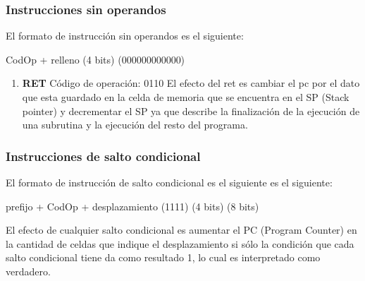 \subsubsection{Instrucciones sin operandos}

El formato de instrucción sin operandos es el siguiente:

 CodOp     +    relleno 
(4 bits)     (000000000000)


\begin{enumerate}
\item \textbf{RET}
Código de operación: 0110
El efecto del ret es cambiar el pc por el dato que esta guardado en la celda de memoria que se encuentra en el SP (Stack pointer) y decrementar el SP ya que describe la finalización de la ejecución de una subrutina y la ejecución del resto del programa.
\end{enumerate}


\subsubsection{Instrucciones de salto condicional}

El formato de instrucción de salto condicional es el siguiente es el siguiente:

 prefijo +   CodOp   +  desplazamiento 
 (1111)     (4 bits)     (8 bits)

El efecto de cualquier salto condicional es aumentar el PC (Program Counter) en la cantidad de celdas que indique el desplazamiento si sólo la condición que cada salto condicional tiene da como resultado 1, lo cual es interpretado como verdadero.

